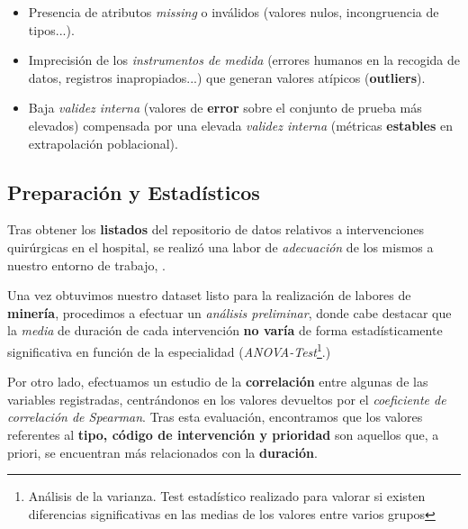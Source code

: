\begin{itemize}
    \item Presencia de atributos \textit{missing} o inválidos (valores nulos, incongruencia de tipos...).
    \item Imprecisión de los \textit{instrumentos de medida} (errores humanos en la recogida de datos, registros inapropiados...) que generan valores atípicos (\textbf{outliers}).
    \item Baja \textit{validez interna} (valores de \textbf{error} sobre el conjunto de prueba más elevados) compensada por una elevada \textit{validez interna} (métricas \textbf{estables} en extrapolación poblacional).
\end{itemize}


 \subsection{Preparación y Estadísticos}

 Tras obtener los \textbf{listados} del repositorio de datos relativos a intervenciones quirúrgicas en el hospital, se realizó una labor de \textit{adecuación} de los mismos a nuestro entorno de trabajo, \cite{McKinney2010DataPython}.



 Una vez obtuvimos nuestro dataset listo para la realización de labores de \textbf{minería}, procedimos a efectuar un \textit{análisis preliminar}, donde cabe destacar que la \textit{media} de duración de cada intervención \textbf{no varía} de forma estadísticamente significativa en función de la especialidad (\textit{ANOVA-Test}\footnote{Análisis de la varianza. Test estadístico realizado para valorar si existen diferencias significativas en las medias de los valores entre varios grupos}.)


 Por otro lado, efectuamos un estudio de la \textbf{correlación} entre algunas de las variables registradas, centrándonos en los valores devueltos por el \textit{coeficiente de correlación de Spearman}\cite{Page1963OrderedRanks}. 
 Tras esta evaluación, encontramos que los valores referentes al \textbf{tipo, código de intervención y prioridad} son aquellos que, a priori, se encuentran más relacionados con la \textbf{duración}.

